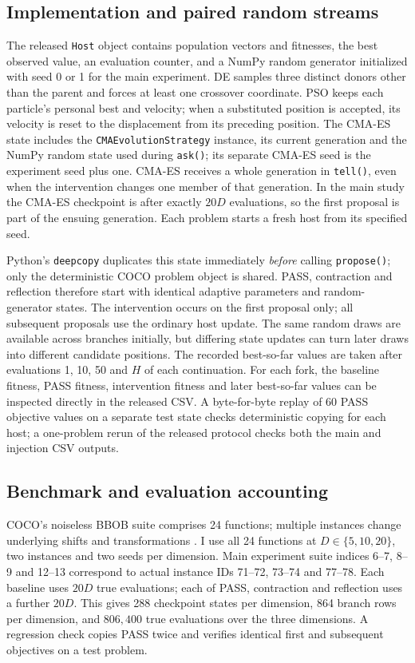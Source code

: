 \documentclass[10pt,letterpaper]{article}
\begin{document}
\subsection*{Implementation and paired random streams}
The released \texttt{Host} object contains population vectors and fitnesses, the best observed value, an evaluation counter, and a NumPy random generator initialized with seed 0 or 1 for the main experiment. DE samples three distinct donors other than the parent and forces at least one crossover coordinate. PSO keeps each particle's personal best and velocity; when a substituted position is accepted, its velocity is reset to the displacement from its preceding position. The CMA-ES state includes the \texttt{CMAEvolutionStrategy} instance, its current generation and the NumPy random state used during \texttt{ask()}; its separate CMA-ES seed is the experiment seed plus one. CMA-ES receives a whole generation in \texttt{tell()}, even when the intervention changes one member of that generation. In the main study the CMA-ES checkpoint is after exactly $20D$ evaluations, so the first proposal is part of the ensuing generation. Each problem starts a fresh host from its specified seed.

Python's \texttt{deepcopy} duplicates this state immediately \emph{before} calling \texttt{propose()}; only the deterministic COCO problem object is shared. PASS, contraction and reflection therefore start with identical adaptive parameters and random-generator states. The intervention occurs on the first proposal only; all subsequent proposals use the ordinary host update. The same random draws are available across branches initially, but differing state updates can turn later draws into different candidate positions. The recorded best-so-far values are taken after evaluations 1, 10, 50 and $H$ of each continuation. For each fork, the baseline fitness, PASS fitness, intervention fitness and later best-so-far values can be inspected directly in the released CSV. A byte-for-byte replay of 60 PASS objective values on a separate test state checks deterministic copying for each host; a one-problem rerun of the released protocol checks both the main and injection CSV outputs.

\subsection*{Benchmark and evaluation accounting}
COCO's noiseless BBOB suite comprises 24 functions; multiple instances change underlying shifts and transformations \cite{hansen2009bbob,hansen2020coco}. I use all 24 functions at $D\in\{5,10,20\}$, two instances and two seeds per dimension. Main experiment suite indices 6--7, 8--9 and 12--13 correspond to actual instance IDs 71--72, 73--74 and 77--78. Each baseline uses $20D$ true evaluations; each of PASS, contraction and reflection uses a further $20D$. This gives 288 checkpoint states per dimension, 864 branch rows per dimension, and $806{,}400$ true evaluations over the three dimensions. A regression check copies PASS twice and verifies identical first and subsequent objectives on a test problem.
\end{document}

